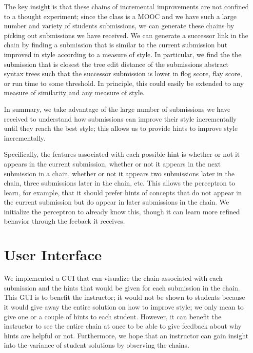 \documentclass[11pt]{article}
\begin{document}
The key insight is that these chains of incremental improvements are not confined to a thought experiment; since the class is a MOOC and we have such a large number and variety of students submissions, we can generate these chains by picking out submissions we have received. We can generate a successor link in the chain by finding a submission that is similar to the current submission but improved in style according to a measure of style. In particular, we find the the submission that is closest the tree edit distance of the submissions abstract syntax trees such that the successor submission is lower in flog score, flay score, or run time to some threshold. In principle, this could easily be extended to any measure of similarity and any measure of style.

In summary, we take advantage of the large number of submissions we have received to understand how submissions can improve their style incrementally until they reach the best style; this allows us to provide hints to improve style incrementally.

Specifically, the features associated with each possible hint is whether or not it appears in the current submission, whether or not it appears in the next submission in a chain, whether or not it appears two submissions later in the chain, three submissions later in the chain, etc. This allows the perceptron to learn, for example, that it should prefer hints of concepts that do not appear in the current submission but do appear in later submissions in the chain. We initialize the perceptron to already know this, though it can learn more refined behavior through the feeback it receives.

\section{User Interface}

We implemented a GUI that can visualize the chain associated with each submission and the hints that would be given for each submission in the chain. This GUI is to benefit the instructor; it would not be shown to students because it would give away the entire solution on how to improve style; we only mean to give one or a couple of hints to each student. However, it can benefit the instructor to see the entire chain at once to be able to give feedback about why hints are helpful or not. Furthermore, we hope that an instructor can gain insight into the variance of student solutions by observing the chains.
\end{document}
